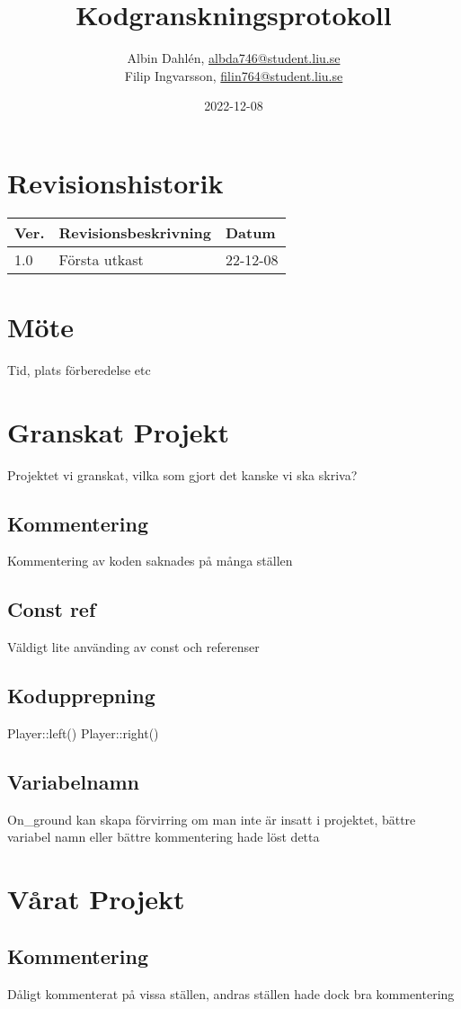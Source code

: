 \documentclass{TDP005mall}
\author{Albin Dahlén, \url{albda746@student.liu.se}\\
  Filip Ingvarsson, \url{filin764@student.liu.se}}
\title{Kodgranskningsprotokoll}
\date{2022-12-08}
\begin{document}
\projectpage
\section{Revisionshistorik}
\begin{table}[!h]
\begin{tabularx}{\linewidth}{|l|X|l|}
\hline
Ver. & Revisionsbeskrivning & Datum \\\hline
1.0 & Första utkast & 22-12-08 \\\hline
\end{tabularx}
\end{table}

\section{Möte}
Tid, plats förberedelse etc

\section{Granskat Projekt}
Projektet vi granskat, vilka som gjort det kanske vi ska skriva?
\subsection{Kommentering}
Kommentering av koden saknades på många ställen

\subsection{Const ref}
Väldigt lite använding av const och referenser

\subsection{Kodupprepning}
Player::left()
Player::right()

\subsection{Variabelnamn}
On\_ground kan skapa förvirring om man inte är insatt i projektet, bättre variabel namn eller bättre kommentering hade löst detta


\section{Vårat Projekt}
\subsection{Kommentering}
Dåligt kommenterat på vissa ställen, andras ställen hade dock bra kommentering
\end{document}
